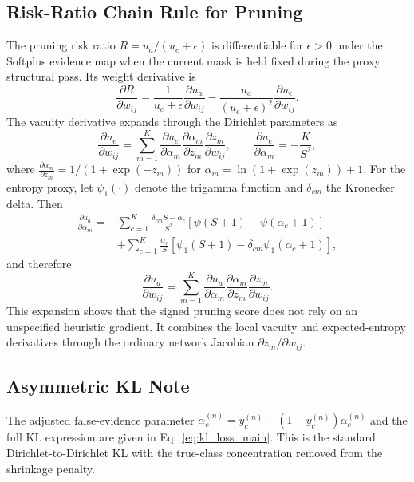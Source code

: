 \documentclass[letterpaper]{article} %
\begin{document}
\subsection{Risk-Ratio Chain Rule for Pruning}
\label{app:r_chain}
The pruning risk ratio $R=u_a/(u_e+\epsilon)$ is differentiable for $\epsilon>0$ under the Softplus evidence map when the current mask is held fixed during the proxy structural pass. Its weight derivative is
\begin{equation}
    \frac{\partial R}{\partial w_{ij}}
    =
    \frac{1}{u_e+\epsilon}\frac{\partial u_a}{\partial w_{ij}}
    -
    \frac{u_a}{(u_e+\epsilon)^2}
    \frac{\partial u_e}{\partial w_{ij}} .
\end{equation}
The vacuity derivative expands through the Dirichlet parameters as
\begin{equation}
    \frac{\partial u_e}{\partial w_{ij}}
    =
    \sum_{m=1}^{K}
    \frac{\partial u_e}{\partial \alpha_m}
    \frac{\partial \alpha_m}{\partial z_m}
    \frac{\partial z_m}{\partial w_{ij}},
    \qquad
    \frac{\partial u_e}{\partial \alpha_m}
    =
    -\frac{K}{S^2},
\end{equation}
where $\frac{\partial \alpha_m}{\partial z_m}=1/(1+\exp(-z_m))$ for $\alpha_m=\ln(1+\exp(z_m))+1$. For the entropy proxy, let $\psi_1(\cdot)$ denote the trigamma function and $\delta_{cm}$ the Kronecker delta. Then
\begin{equation}
\begin{aligned}
    \frac{\partial u_a}{\partial \alpha_m}
    ={}&
    \sum_{c=1}^{K}
    \frac{\delta_{cm}S-\alpha_c}{S^2}
    \left[\psi(S+1)-\psi(\alpha_c+1)\right]\\
    &+
    \sum_{c=1}^{K}
    \frac{\alpha_c}{S}
    \left[
    \psi_1(S+1)-\delta_{cm}\psi_1(\alpha_c+1)
    \right],
\end{aligned}
\end{equation}
and therefore
\begin{equation}
    \frac{\partial u_a}{\partial w_{ij}}
    =
    \sum_{m=1}^{K}
    \frac{\partial u_a}{\partial \alpha_m}
    \frac{\partial \alpha_m}{\partial z_m}
    \frac{\partial z_m}{\partial w_{ij}} .
\end{equation}
This expansion shows that the signed pruning score does not rely on an unspecified heuristic gradient. It combines the local vacuity and expected-entropy derivatives through the ordinary network Jacobian $\partial z_m/\partial w_{ij}$.

\subsection{Asymmetric KL Note}
The adjusted false-evidence parameter $\tilde{\alpha}_c^{(n)}=y_c^{(n)}+(1-y_c^{(n)})\alpha_c^{(n)}$ and the full KL expression are given in Eq.~\ref{eq:kl_loss_main}. This is the standard Dirichlet-to-Dirichlet KL with the true-class concentration removed from the shrinkage penalty.
\end{document}
